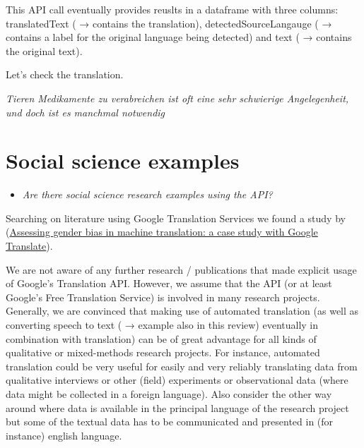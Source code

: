 \documentclass[
]{book}
\newenvironment{Shaded}{\begin{snugshade}}{\end{snugshade}}
\newcommand{\NormalTok}[1]{#1}
\newcommand{\SpecialCharTok}[1]{\textcolor[rgb]{0.00,0.00,0.00}{#1}}
\providecommand{\tightlist}{%
  \setlength{\itemsep}{0pt}\setlength{\parskip}{0pt}}
\begin{document}
This API call eventually provides reuslts in a dataframe with three columns: translatedText ( → contains the translation), detectedSourceLangauge ( → contains a label for the original language being detected) and text ( → contains the original text).

Let's check the translation.

\begin{Shaded}
\end{Shaded}

\emph{Tieren Medikamente zu verabreichen ist oft eine sehr schwierige Angelegenheit, und doch ist es manchmal notwendig}

\hypertarget{social-science-examples-1}{%
\section{Social science examples}\label{social-science-examples-1}}

\begin{itemize}
\tightlist
\item
  \emph{Are there social science research examples using the API?}
\end{itemize}

Searching on literature using Google Translation Services we found a study by \citet{Prates2018-fx} (\href{\%22https://arxiv.org/abs/1809.02208\%22}{Assessing gender bias in machine translation: a case study with Google Translate}).

We are not aware of any further research / publications that made explicit usage of Google's Translation API. However, we assume that the API (or at least Google's Free Translation Service) is involved in many research projects. Generally, we are convinced that making use of automated translation (as well as converting speech to text ( → example also in this review) eventually in combination with translation) can be of great advantage for all kinds of qualitative or mixed-methods research projects. For instance, automated translation could be very useful for easily and very reliably translating data from qualitative interviews or other (field) experiments or observational data (where data might be collected in a foreign language). Also consider the other way around where data is available in the principal language of the research project but some of the textual data has to be communicated and presented in (for instance) english language.
\end{document}

